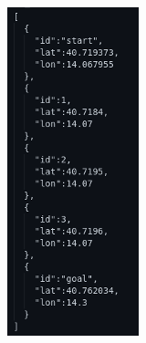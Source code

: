 \documentclass[journal,article,submit,pdftex,moreauthors]{Definitions/mdpi}
\begin{document}
\begin{figure}[h]
	\begin{subfigure}{0.3\textwidth}
		\centering
		\includegraphics[width=\textwidth]{res/imgs/MQTT_in.png}

\end{subfigure}
\end{figure}
\end{document}
